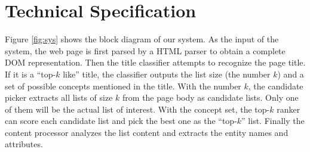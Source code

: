 \section{Technical Specification}
\label{sec:algo}

\begin{figure*}[th]
\centering
{}
\caption{System Overview}
\label{fig:sys}
\end{figure*}

Figure \ref{fig:sys} shows the block diagram of our system.
As the input of the system, the web page is first parsed by 
a HTML parser\cite{winista} to obtain a complete DOM representation.
Then the title classifier attempts to recognize the page title.
If it is a ``top-$k$ like'' title, 
the classifier outputs the list size (the number $k$) 
and a set of possible concepts mentioned in the title.
With the number $k$, the candidate picker extracts all lists of size $k$ 
from the page body as candidate lists. Only one of them will be the actual
list of interest. With the concept set, 
the top-$k$ ranker can score each candidate list and pick the best one 
as the ``top-$k$'' list.  Finally the content processor  
analyzes the list content and extracts the entity names and attributes. 









